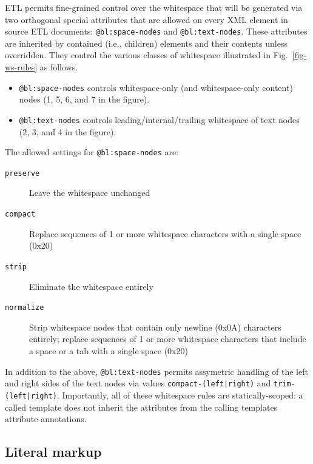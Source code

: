 \documentclass{www2003-submission}
\newcommand{\smtexttt}[1]{{\small\texttt{#1}}}
\newcommand{\figref}[1]{Fig.~\ref{fig-#1}}
\begin{document}
ETL permits fine-grained control over the whitespace that will be
generated via two orthogonal special attributes that are allowed on
every XML element in source ETL documents: \smtexttt{@bl:space-nodes}
and \smtexttt{@bl:text-nodes}.  These attributes are inherited by
contained (i.e., children) elements and their contents unless
overridden.  They control the various classes of whitespace
illustrated in \figref{ws-rules} as follows.

\begin{itemize}
\item \smtexttt{@bl:space-nodes} controls whitespace-only (and
      whitespace-only content) nodes (1, 5, 6, and 7 in the figure).
\item \smtexttt{@bl:text-nodes} controls leading/internal/trailing whitespace of
      text nodes (2, 3, and 4 in the figure).
\end{itemize}

The allowed settings for \smtexttt{@bl:space-nodes} are:

\begin{description}
  
\item[\smtexttt{preserve}] Leave the whitespace unchanged
      
\item[\smtexttt{compact}] Replace sequences of 1 or more
      whitespace characters with a single space (0x20)
      
\item[\smtexttt{strip}] Eliminate the whitespace entirely

\item[\smtexttt{normalize}] Strip whitespace nodes that contain only
newline (0x0A) characters entirely; replace sequences of 1 or more
whitespace characters that include a space or a tab with a single
space (0x20)

\end{description}

In addition to the above, \smtexttt{@bl:text-nodes} permits assymetric
handling of the left and right sides of the text nodes via values
\smtexttt{compact-(left|right)} and \smtexttt{trim-(left|right)}. 
Importantly, all of these whitespace rules are statically-scoped:
a called template does not inherit the attributes from the calling
templates attribute annotations.

\subsection{Literal markup}
\end{document}
